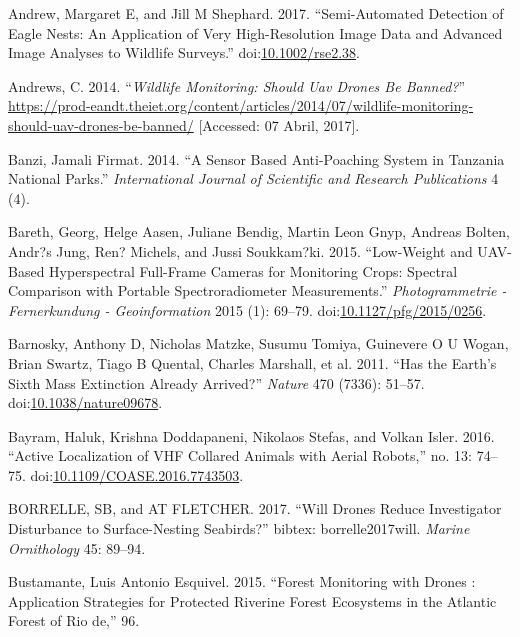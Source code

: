 \documentclass[]{interact}
\theoremstyle{plain}%
\theoremstyle{definition}
\theoremstyle{remark}
\begin{document}
\hypertarget{ref-andrew_semi-automated_2017}{}
Andrew, Margaret E, and Jill M Shephard. 2017. ``Semi-Automated
Detection of Eagle Nests: An Application of Very High-Resolution Image
Data and Advanced Image Analyses to Wildlife Surveys.''
doi:\href{https://doi.org/10.1002/rse2.38}{10.1002/rse2.38}.

\hypertarget{ref-Andrews2014}{}
Andrews, C. 2014. ``\emph{Wildlife Monitoring: Should Uav Drones Be
Banned?}''
\url{https://prod-eandt.theiet.org/content/articles/2014/07/wildlife-monitoring-should-uav-drones-be-banned/}
{[}Accessed: 07 Abril, 2017{]}.

\hypertarget{ref-banzi_sensor_2014}{}
Banzi, Jamali Firmat. 2014. ``A Sensor Based Anti-Poaching System in
Tanzania National Parks.'' \emph{International Journal of Scientific and
Research Publications} 4 (4).

\hypertarget{ref-bareth_low-weight_2015}{}
Bareth, Georg, Helge Aasen, Juliane Bendig, Martin Leon Gnyp, Andreas
Bolten, Andr?s Jung, Ren? Michels, and Jussi Soukkam?ki. 2015.
``Low-Weight and UAV-Based Hyperspectral Full-Frame Cameras for
Monitoring Crops: Spectral Comparison with Portable Spectroradiometer
Measurements.'' \emph{Photogrammetrie - Fernerkundung - Geoinformation}
2015 (1): 69--79.
doi:\href{https://doi.org/10.1127/pfg/2015/0256}{10.1127/pfg/2015/0256}.

\hypertarget{ref-barnosky_has_2011}{}
Barnosky, Anthony D, Nicholas Matzke, Susumu Tomiya, Guinevere O U
Wogan, Brian Swartz, Tiago B Quental, Charles Marshall, et al. 2011.
``Has the Earth's Sixth Mass Extinction Already Arrived?'' \emph{Nature}
470 (7336): 51--57.
doi:\href{https://doi.org/10.1038/nature09678}{10.1038/nature09678}.

\hypertarget{ref-bayram_active_2016}{}
Bayram, Haluk, Krishna Doddapaneni, Nikolaos Stefas, and Volkan Isler.
2016. ``Active Localization of VHF Collared Animals with Aerial
Robots,'' no. 13: 74--75.
doi:\href{https://doi.org/10.1109/COASE.2016.7743503}{10.1109/COASE.2016.7743503}.

\hypertarget{ref-borrelle_will_2017}{}
BORRELLE, SB, and AT FLETCHER. 2017. ``Will Drones Reduce Investigator
Disturbance to Surface-Nesting Seabirds?'' bibtex: borrelle2017will.
\emph{Marine Ornithology} 45: 89--94.

\hypertarget{ref-bustamante_forest_2015}{}
Bustamante, Luis Antonio Esquivel. 2015. ``Forest Monitoring with Drones
: Application Strategies for Protected Riverine Forest Ecosystems in the
Atlantic Forest of Rio de,'' 96.
\end{document}
